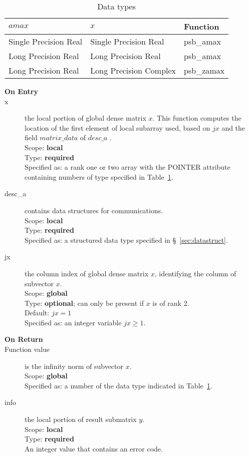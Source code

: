
\begin{table}[h]
\begin{center}
\begin{tabular}{lll}
\hline
$amax$ & $x$ & {\bf Function}\\
\hline
Single Precision Real&Single Precision Real & psb\_amax\\
Long Precision Real&Long Precision Real & psb\_amax \\
Long Precision Real&Long Precision Complex & psb\_zamax \\
\hline
\end{tabular}
\end{center}
\caption{Data types\label{tab:f90amax}}
\end{table}


\begin{description}
\item[\bf On Entry]
\item[x] the local portion of global dense matrix
$x$. This function computes the location of the first element of
local subarray used, based on $jx$ and the field $matrix\_data$ of $desc\_a$ . \\
Scope: {\bf local} \\
Type: {\bf required} \\
Specified as:  a rank one or two array with the POINTER attribute 
containing numbers of type specified in
Table~\ref{tab:f90amax}.
\item[desc\_a] contains data structures for communications.\\
Scope: {\bf local} \\
Type: {\bf required}\\
Specified as: a structured data type specified in
\S~\ref{sec:datastruct}.
\item[jx]  the column index of global dense matrix $x$,
identifying the column of subvector $x$.\\
Scope: {\bf global} \\
Type: {\bf optional}; can only be present if $x$ is of rank 2.\\	
Default: $jx = 1$\\	
Specified as: an integer variable $jx\ge 1$. 

\item[\bf On Return] 
\item[Function value] is the infinity norm of subvector $x$.\\
Scope: {\bf global} \\
Specified as: a number of the data type indicated in Table~\ref{tab:f90amax}.
\item[info] the local portion of result submatrix $y$.\\
Scope: {\bf local} \\
Type: {\bf required} \\
An integer value that contains an error code. 
\end{description}
%
%

